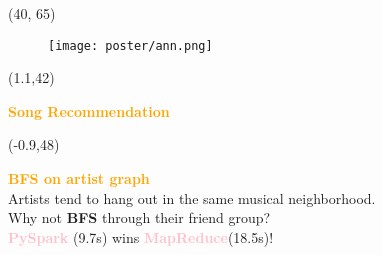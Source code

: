 \documentclass{beamer}
\begin{document}
\begin{textblock}{20}(40, 65)
\begin{figure}
    \centering
    \texttt{[image: poster/ann.png]}
\end{figure}
    
\end{textblock}


\begin{textblock}{30}(1.1,42)
  \begin{basebox}[frame hidden, interior hidden, halign=center, valign=center]
    \color{white}

    \begin{minipage}{0.85\linewidth}
        \textcolor{orange}{\Huge\textbf{Song Recommendation}}
    \end{minipage}

    \vspace{2cm}
  \end{basebox}
\end{textblock}


\begin{textblock}{16}(-0.9,48)
  \begin{basebox}[frame hidden, interior hidden, halign=center, valign=center]
    \color{white}

    \begin{minipage}{0.85\linewidth}
        \raggedleft
        {\textcolor{orange}{\LARGE\textbf{BFS on artist graph}}} \\[0.8cm]
        
        {\Large Artists tend to hang out in the same musical neighborhood.} \\[0.8cm]
        
        {\Large Why not \textbf{BFS} through their friend group?} \\[0.8cm] 
        
        {\textcolor{pink}{\LARGE\textbf{PySpark}} \Large(9.7s) wins \LARGE \textcolor{pink}{\textbf{MapReduce}}\Large(18.5s)!}
    \end{minipage}

    \vspace{2cm}
  \end{basebox}
\end{textblock}
\end{document}

